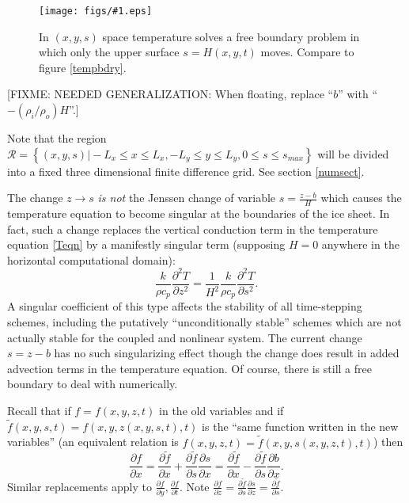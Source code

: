 \documentclass[12pt,final]{amsart}%
\theoremstyle{plain}
\theoremstyle{definition}
\theoremstyle{remark}
\newcommand{\regfigure}[2]{\texttt{[image: figs/\#1.eps]}}
\newcommand{\ddt}[1]{\ensuremath{\frac{\partial #1}{\partial t}}}
\newcommand{\ddx}[1]{\ensuremath{\frac{\partial #1}{\partial x}}}
\newcommand{\ddy}[1]{\ensuremath{\frac{\partial #1}{\partial y}}}
\newcommand{\ddz}[1]{\ensuremath{\frac{\partial #1}{\partial z}}}
\newcommand{\dds}[1]{\ensuremath{\frac{\partial #1}{\partial s}}}
\begin{document}
\begin{figure}[ht]
\vspace{-2mm}
\regfigure{stempbdryfig}{3}
\vspace{-4mm}
\caption{In $(x,y,s)$ space temperature solves a free boundary problem in which only the upper surface $s=H(x,y,t)$ moves.  Compare to figure \ref{tempbdry}.}
\label{stempbdry}
\end{figure}

[FIXME: NEEDED GENERALIZATION:  When floating, replace ``$b$'' with ``$-(\rho_i/\rho_o) H$''.]

Note that the region $\mathcal{R}=\left\{(x,y,s)\big| -L_x\le x \le L_x, -L_y\le y \le L_y, 0\le s \le s_{max}\right\}$ will be divided into a fixed three dimensional finite difference grid.  See section \ref{numsect}.

The change $z\to s$ \emph{is not} the Jenssen \citep{Jenssen} change of variable $s=\frac{z-b}{H}$ which causes the temperature equation to become singular at the boundaries of the ice sheet.  In fact, such a change replaces the vertical conduction term in the temperature equation \eqref{Teqn} by a manifestly singular term (supposing $H=0$ anywhere in the horizontal computational domain):
    $$\frac{k}{\rho c_p} \frac{\partial^2 T}{\partial z^2} = \frac{1}{H^2} \frac{k}{\rho c_p} \frac{\partial^2 T}{\partial s^2}.$$
A singular coefficient of this type affects the stability of all time-stepping schemes, including the putatively ``unconditionally stable'' schemes which are not actually stable for the coupled and nonlinear system.  The current change $s=z-b$ has no such singularizing effect though the change does result in added advection terms in the temperature equation.  Of course, there is still a free boundary to deal with numerically.

Recall that if $f=f(x,y,z,t)$ in the old variables and if $\tilde f(x,y,s,t)=f(x,y,z(x,y,s,t),t)$ is the ``same function written in the new variables'' (an equivalent relation is $f(x,y,z,t)=\tilde f(x,y,s(x,y,z,t),t)$) then
    $$\ddx{f} = \ddx{\tilde f}+\dds{\tilde f}\ddx{s} = \ddx{\tilde f}-\dds{\tilde f}\ddx{b}.$$
Similar replacements apply to $\ddy{f},\ddt{f}$. Note $\ddz{f}=\dds{\tilde f} \ddz{s} = \dds{\tilde f}$.
\end{document}
